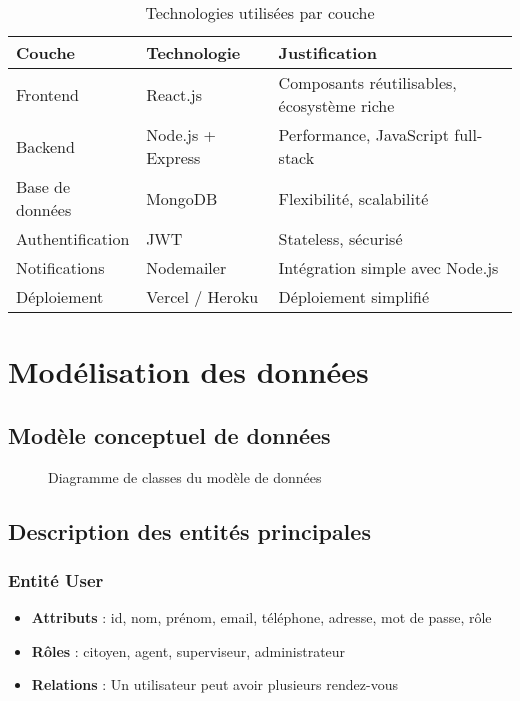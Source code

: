 \begin{table}[h]
\centering
\begin{tabular}{|l|l|p{6cm}|}
\hline
\textbf{Couche} & \textbf{Technologie} & \textbf{Justification} \\
\hline
Frontend & React.js & Composants réutilisables, écosystème riche \\
\hline
Backend & Node.js + Express & Performance, JavaScript full-stack \\
\hline
Base de données & MongoDB & Flexibilité, scalabilité \\
\hline
Authentification & JWT & Stateless, sécurisé \\
\hline
Notifications & Nodemailer & Intégration simple avec Node.js \\
\hline
Déploiement & Vercel / Heroku & Déploiement simplifié \\
\hline
\end{tabular}
\caption{Technologies utilisées par couche}
\label{tab:technologies}
\end{table}

\section{Modélisation des données}

\subsection{Modèle conceptuel de données}

\begin{figure}[h]
    \centering
    \caption{Diagramme de classes du modèle de données}
    \label{fig:data_model}
\end{figure}

\subsection{Description des entités principales}

\subsubsection{Entité User}
\begin{itemize}
    \item \textbf{Attributs} : id, nom, prénom, email, téléphone, adresse, mot de passe, rôle
    \item \textbf{Rôles} : citoyen, agent, superviseur, administrateur
    \item \textbf{Relations} : Un utilisateur peut avoir plusieurs rendez-vous
\end{itemize}


